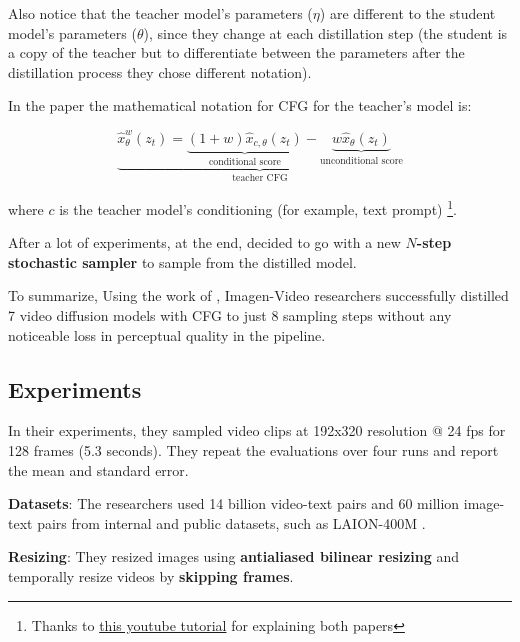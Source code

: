Also notice that the teacher model's parameters ($\eta$) are different to the student model's parameters ($\theta$), since they change at each distillation step (the student is a copy of the teacher but to differentiate between the parameters after the distillation process they chose different notation).



In the paper the mathematical notation for CFG for the teacher's model is:

\[  
    \underbrace{
        \hat{x}_{\theta}^w(z_t) = 
        \underbrace{(1+w) \hat{x}_{c,\theta} (z_t)}_{\text{conditional score}} - 
        \underbrace{w \hat{x}_\theta (z_t)}_{\text{unconditional score}}
    }_{\text{teacher CFG}}
\]

where $c$ is the teacher model's conditioning (for example, text prompt) \footnote{Thanks to \href{https://www.youtube.com/watch?v=ZXuK6IRJlnk}{this youtube tutorial} for explaining both papers}.

After a lot of experiments, at the end, \cite{meng2023distillation} decided to go with a new \textbf{$N$-step stochastic sampler} to sample from the distilled model.

To summarize, Using the work of \cite{meng2023distillation}, Imagen-Video researchers successfully distilled 7 video diffusion models with CFG to just 8 sampling steps without any noticeable loss in perceptual quality in the pipeline.














\subsection{Experiments}

In their experiments, they sampled video clips at 192x320 resolution @ 24 fps for 128 frames (5.3 seconds). They repeat the evaluations over four runs and report the mean and standard error.

\textbf{Datasets}: The researchers used 14 billion video-text pairs and 60 million image-text pairs from internal and public datasets, such as LAION-400M \cite{laion_400m}.

\textbf{Resizing}: They resized images using \textbf{antialiased bilinear resizing} and temporally resize videos by \textbf{skipping frames}.

